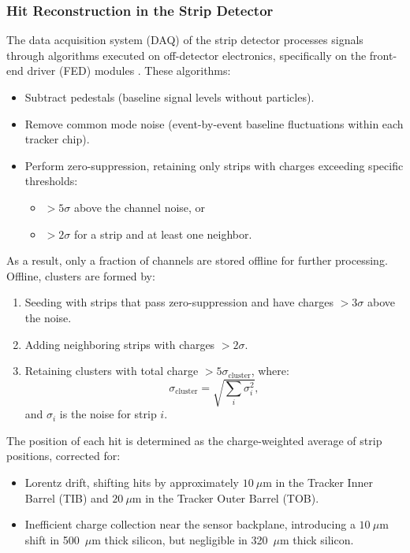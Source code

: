 \subsubsection{Hit Reconstruction in the Strip Detector}

The data acquisition system (DAQ) of the strip detector processes signals through algorithms executed on off-detector electronics, specifically on the front-end driver (FED) modules \cite{Tracking_2014}. These algorithms:
\begin{itemize}
    \item Subtract pedestals (baseline signal levels without particles).
    \item Remove common mode noise (event-by-event baseline fluctuations within each tracker chip).
    \item Perform zero-suppression, retaining only strips with charges exceeding specific thresholds:
    \begin{itemize}
        \item \(> 5\sigma\) above the channel noise, or
        \item \(> 2\sigma\) for a strip and at least one neighbor.
    \end{itemize}
\end{itemize}

As a result, only a fraction of channels are stored offline for further processing.\\

Offline, clusters are formed by:
\begin{enumerate}
    \item Seeding with strips that pass zero-suppression and have charges \(> 3\sigma\) above the noise.
    \item Adding neighboring strips with charges \(> 2\sigma\).
    \item Retaining clusters with total charge \(> 5\sigma_{\text{cluster}}\), where:
    \[
    \sigma_{\text{cluster}} = \sqrt{\sum_i \sigma_i^2},
    \]
    and \(\sigma_i\) is the noise for strip \(i\).
\end{enumerate}

The position of each hit is determined as the charge-weighted average of strip positions, corrected for:
\begin{itemize}
    \item Lorentz drift, shifting hits by approximately \(10~\mu\text{m}\) in the Tracker Inner Barrel (TIB) and \(20~\mu\text{m}\) in the Tracker Outer Barrel (TOB).
    \item Inefficient charge collection near the sensor backplane, introducing a \(10~\mu\text{m}\) shift in 500~\(\mu\text{m}\) thick silicon, but negligible in 320~\(\mu\text{m}\) thick silicon.
\end{itemize}

